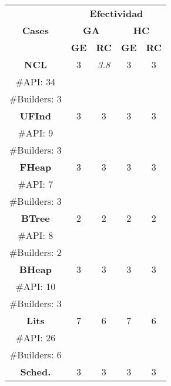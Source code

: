 \begin{table}[H]
\centering
\scriptsize
\begin{tabular}{c ccccc}
\midrule
\multicolumn{2}{c}{\multirow{3}{*}{\textbf{Cases}}} & \multicolumn{4}{c}{\textbf{Efectividad}} \\
\cline{3-6}
\multicolumn{2}{c}{} & \multicolumn{2}{c}{\textbf{GA}} & \multicolumn{2}{c}{\textbf{HC}}  \\
\multicolumn{2}{c}{} & \textbf{\tiny{GE}} & \textbf{\tiny{RC}} & \textbf{\tiny{GE}} & \textbf{\tiny{RC}}  \\
\midrule
\multicolumn{2}{c}{\textbf{NCL}} & 3  &   \cellcolor{gray!25} \emph{3.8} & 3 &  3 \\
\multicolumn{2}{c}{\tiny \#API: 34} &  &   & &    \\
\multicolumn{2}{c}{\tiny \#Builders: 3} &  &   & &    \\

\midrule
\multicolumn{2}{c}{\textbf{UFInd}}& 3 & 3  & 3  & 3      \\
\multicolumn{2}{c}{\tiny \#API: 9} &  &   & &   \\
\multicolumn{2}{c}{\tiny \#Builders: 3} &  &   & &    \\
\midrule

\multicolumn{2}{c}{\textbf{FHeap}}& 3 & 3  &  3 &  3   \\
\multicolumn{2}{c}{\tiny \#API: 7} &  &   & &    \\
\multicolumn{2}{c}{\tiny \#Builders: 3} &  &   & &    \\
\midrule
\multicolumn{2}{c}{\textbf{BTree}} & 2 & 2  &  2 &  2   \\
\multicolumn{2}{c}{\tiny \#API: 8} &  &   & &    \\
\multicolumn{2}{c}{\tiny \#Builders: 2} &  &   & &    \\
\midrule
\multicolumn{2}{c}{\textbf{BHeap}}& 3 & 3 &  3 &  3    \\
\multicolumn{2}{c}{\tiny \#API: 10} &  &   & &   \\
\multicolumn{2}{c}{\tiny \#Builders: 3} &  &   & &   \\
\midrule
\multicolumn{2}{c}{\textbf{Lits}} &  7 & 6 & 7 &  6    \\
\multicolumn{2}{c}{\tiny \#API: 26} &  &   & &    \\
\multicolumn{2}{c}{\tiny \#Builders: 6} &  &   & &   \\
\midrule
\multicolumn{2}{c}{\textbf{Sched.}} &  3 & 3   & 3  &  3 \\


\end{tabular}
\end{table}
